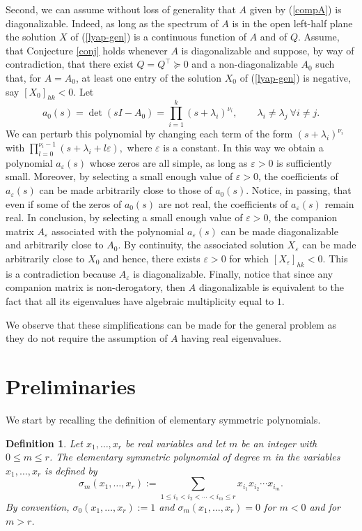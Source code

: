 \documentclass[10pt,a4paper]{amsart}
\newcommand{\tp}{^{\top}}
\newtheorem{definition}{Definition}[section]
\begin{document}
Second, we can assume without loss of generality that $A$ given by (\ref{compA}) is diagonalizable.
Indeed, as long as the spectrum of $A$ is in the open left-half plane the solution $X$ 
of (\ref{lyap-gen}) is a continuous function of $A$ and of $Q$. Assume,
that Conjecture \ref{conj} holds whenever $A$ is diagonalizable and suppose, by way of contradiction, that there exist $Q=Q\tp\succeq  0$ and a non-diagonalizable  $A_0$ such that, for $A=A_0$, at least one entry  of the solution $X_0$ of (\ref{lyap-gen}) is negative, say  $[X_0]_{hk}<0$.
Let
$$
a_0(s)=\det(sI-A_0)=\prod_{i=1}^k (s+\lambda_i)^{\nu_i},\qquad \lambda_i\neq\lambda_j\ \forall i\neq j.
$$
We can perturb this polynomial by changing each term of the form $(s+\lambda_i)^{\nu_i}$ with
$\prod_{l=0}^{\nu_i-1}(s+\lambda_i+l\varepsilon),$ where $\varepsilon$ is a constant.
In this way we obtain a polynomial $a_\varepsilon(s)$ whose zeros are all simple, as long as
$\varepsilon>0$ is sufficiently small. Moreover, by selecting a small enough value of $\varepsilon>0$, the coefficients of $a_\varepsilon(s)$ can be made arbitrarily close to those of $a_0(s)$. Notice, in passing, that even if some of the zeros of $a_0(s)$ are not real, the coefficients of $a_\varepsilon(s)$ remain  real.
In conclusion, by selecting a small enough value of $\varepsilon>0$, the companion matrix $A_\varepsilon$ associated with the polynomial $a_\varepsilon(s)$  can be made diagonalizable and arbitrarily close to
$A_0$. By continuity, the associated solution $X_\varepsilon$ can be made arbitrarily close to
$X_0$ and hence, there exists $\varepsilon>0$ for which $[X_\varepsilon]_{hk}<0$.
This is a contradiction because $A_\varepsilon$ is diagonalizable.
Finally, notice that since any companion matrix is non-derogatory, then $A$ diagonalizable is equivalent to the fact that all its eigenvalues have algebraic multiplicity equal to $1$.

We observe that these simplifications can be made for the general problem as they do not require the assumption of $A$ having real eigenvalues.

\section{Preliminaries}

We start by recalling the definition of elementary symmetric polynomials.
\begin{definition}
Let $x_1,\dots,x_r$ be real variables and let $m$ be an integer with
$0\le m\le r$.
The \emph{elementary symmetric polynomial of degree $m$}
in the variables $x_1,\dots,x_r$ is defined by
\[
\sigma_m(x_1,\dots,x_r)
:=
\sum_{1\le i_1<i_2<\cdots<i_m\le r}
x_{i_1}x_{i_2}\cdots x_{i_m}.
\]
By convention, $\sigma_0(x_1,\dots,x_r):=1$ and $\sigma_m(x_1,\dots,x_r)=0$ for $m<0$ and for $m>r$.
\end{definition}
\end{document}

